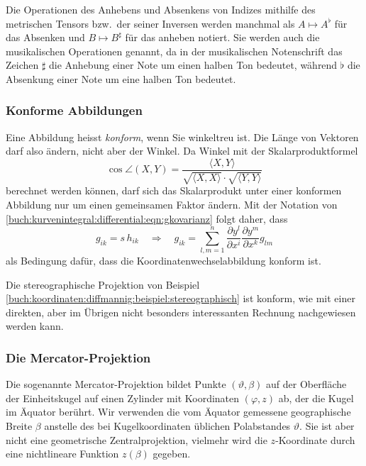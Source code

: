 Die Operationen des Anhebens und Absenkens von Indizes mithilfe
des metrischen Tensors bzw.~der seiner Inversen werden manchmal
als $A\mapsto A^\flat$ für das Absenken und $B\mapsto B^\sharp$
für das anheben notiert.
Sie werden auch die musikalischen Operationen genannt, da
%
in der musikalischen Notenschrift das Zeichen $\sharp$ die
%
Anhebung einer Note um einen halben Ton bedeutet, während
$\flat$ die Absenkung einer Note um eine halben Ton bedeutet.
\index{\flat@$\flat$}%

%
%
\subsubsection{Konforme Abbildungen}
Eine Abbildung heisst {\em konform}, wenn Sie winkeltreu ist.
Die Länge von Vektoren darf also ändern, nicht aber der Winkel.
Da Winkel mit der Skalarproduktformel
\[
\cos \angle(X,Y)
=
\frac{
\langle X,Y \rangle
}{
\!\sqrt{\langle X, X\rangle}\cdot\!\sqrt{\langle Y,Y\rangle}
}
\]
berechnet werden können, darf sich das Skalarprodukt unter einer
konformen Abbildung nur um einen gemeinsamen Faktor ändern.
Mit der Notation von
\eqref{buch:kurvenintegral:differential:eqn:gkovarianz}
folgt daher, dass
\[
g_{ik} = s\,h_{ik}
\quad\Rightarrow\quad
g_{ik}
=
\sum_{l,m=1}^n
\frac{\partial y^l}{\partial x^i}
\frac{\partial y^m}{\partial x^k}
g_{lm}
\]
als Bedingung dafür, dass die Koordinatenwechselabbildung
konform ist.

\begin{beispiel}
Die stereographische Projektion von Beispiel 
\ref{buch:koordinaten:diffmannig:beispiel:stereographisch}
ist konform, wie mit einer direkten, aber im Übrigen nicht
besonders interessanten Rechnung nachgewiesen werden kann.
\end{beispiel}

%
%
\subsubsection{Die Mercator-Projektion}
Die sogenannte Mercator-Projektion bildet Punkte $(\vartheta,\beta)$
%
auf der Oberfläche der Einheitskugel auf einen Zylinder mit Koordinaten
$(\varphi,z)$ ab, der die Kugel im Äquator berührt.
%
Wir verwenden die vom Äquator gemessene geographische Breite $\beta$
%
anstelle des bei Kugelkoordinaten üblichen Polabstandes $\vartheta$.
Sie ist aber nicht eine geometrische Zentralprojektion, vielmehr wird die
$z$-Koordinate durch eine nichtlineare Funktion $z(\beta)$
gegeben.

